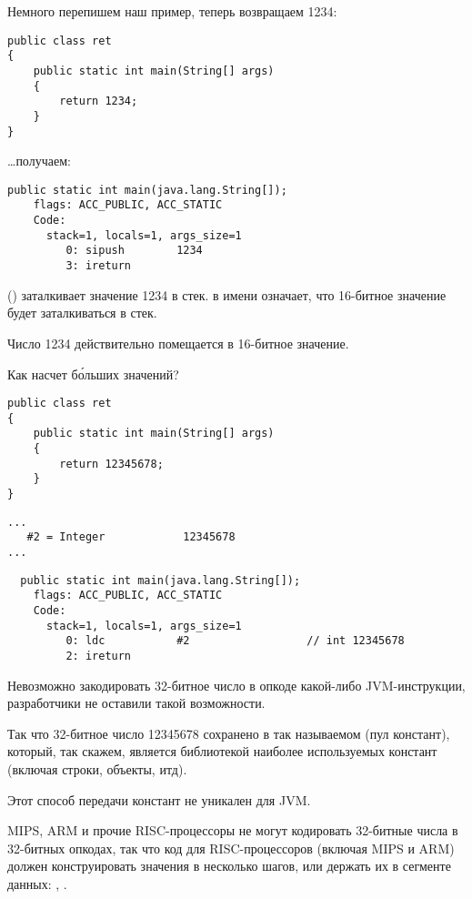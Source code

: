 Немного перепишем наш пример, теперь возвращаем 1234:

\begin{lstlisting}[style=customjava]
public class ret
{
	public static int main(String[] args)
	{
		return 1234;
	}
}
\end{lstlisting}

\dots получаем:

\begin{lstlisting}[caption=JDK 1.7 (excerpt)]
  public static int main(java.lang.String[]);
    flags: ACC_PUBLIC, ACC_STATIC
    Code:
      stack=1, locals=1, args_size=1
         0: sipush        1234
         3: ireturn       
\end{lstlisting}

 () заталкивает значение 1234 в стек.
 в имени означает, что 16-битное значение будет заталкиваться в стек. 

Число 1234 действительно помещается в 16-битное значение.

Как насчет б\'{о}льших значений?

\begin{lstlisting}[style=customjava]
public class ret
{
	public static int main(String[] args) 
	{
		return 12345678;
	}
}
\end{lstlisting}

\begin{lstlisting}[caption=Constant pool]
...
   #2 = Integer            12345678
...
\end{lstlisting}

\begin{lstlisting}
  public static int main(java.lang.String[]);
    flags: ACC_PUBLIC, ACC_STATIC
    Code:
      stack=1, locals=1, args_size=1
         0: ldc           #2                  // int 12345678
         2: ireturn       
\end{lstlisting}

Невозможно закодировать 32-битное число в опкоде какой-либо JVM-инструкции, 
разработчики не оставили такой возможности.

Так что 32-битное число 12345678 сохранено в так называемом  (пул констант),
который, так скажем, является библиотекой наиболее используемых констант (включая строки, объекты,
итд).

Этот способ передачи констант не уникален для JVM.

MIPS, ARM и прочие RISC-процессоры не могут кодировать 32-битные числа в 32-битных опкодах,
так что код для RISC-процессоров (включая MIPS и ARM) должен конструировать значения 
в несколько шагов, или держать их в сегменте данных:
, .

